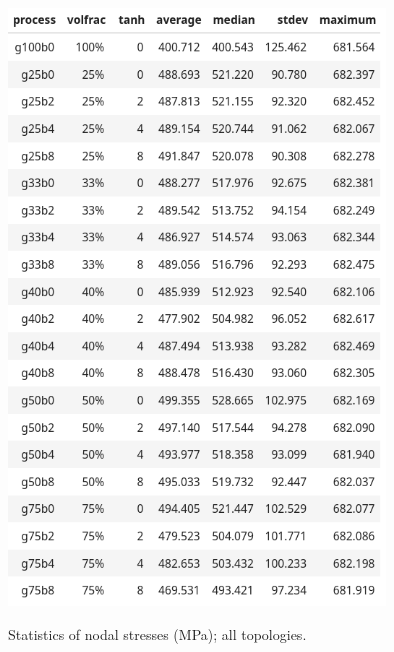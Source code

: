 \documentclass[../main.tex]{subfiles}
\begin{document}
\begin{table}[h!]
  \centering
  \includegraphics[width=0.75\textwidth]{images/results/plots/femoral/stress/stress_stats.png}
  \caption{Statistics of nodal stresses (MPa); all topologies.}
  \label{table:stress_stats}
\end{table}
\end{document}
